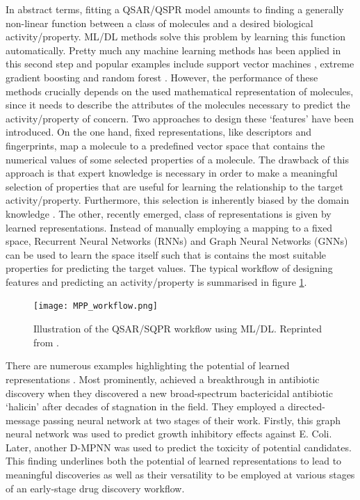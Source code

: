 In abstract terms, fitting a QSAR/QSPR model amounts to finding a generally non-linear function between a class of molecules and a desired biological activity/property. ML/DL methods solve this problem by learning this function automatically. Pretty much any machine learning methods has been applied in this second step \cite{SHEN201929} and popular examples include support vector machines \cite{supv1, supv2}, extreme gradient boosting \cite{XG1, XG2} and random forest \cite{RF1}. However, the performance of these methods crucially depends on the used mathematical representation of molecules, since it needs to describe the attributes of the molecules necessary to predict the activity/property of concern. Two approaches to design these `features' have been introduced. On the one hand, fixed representations, like descriptors and fingerprints, map a molecule to a predefined vector space that contains the numerical values of some selected properties of a molecule. The drawback of this approach is that expert knowledge is necessary in order to make a meaningful selection of properties that are useful for learning the relationship to the target activity/property. Furthermore, this selection is inherently biased by the domain knowledge \citep{merkwirth}. The other, recently emerged, class of representations is given by learned representations. Instead of manually employing a mapping to a fixed space, Recurrent Neural Networks (RNNs) and Graph Neural Networks (GNNs) can be used to learn the space itself such that is contains the most suitable properties for predicting the target values.  The typical workflow of designing features and predicting an activity/property is summarised in figure \ref{fig:mpp_workflow}.
\begin{figure}[h]
	\centering 
	\texttt{[image: MPP\_workflow.png]}
	\caption{Illustration of the QSAR/SQPR workflow using ML/DL. Reprinted from \cite{yangMPP}. }
	\label{fig:mpp_workflow}
\end{figure}

There are numerous examples highlighting the potential of learned representations \citep{duvenaud2015convolutional, li2019deepchemstable, honda}. Most prominently, \cite{STOKES2020688} achieved a breakthrough in antibiotic discovery when they discovered a new broad-spectrum bactericidal antibiotic `halicin' after decades of stagnation in the field. They employed a directed-message passing neural network \cite{yangMPP} at two stages of their work. Firstly, this graph neural network was used to predict growth inhibitory effects against E. Coli. Later, another D-MPNN was used to predict the toxicity of potential candidates. This finding underlines both the potential of learned representations to lead to meaningful discoveries as well as their versatility to be employed at various stages of an early-stage drug discovery workflow. 

